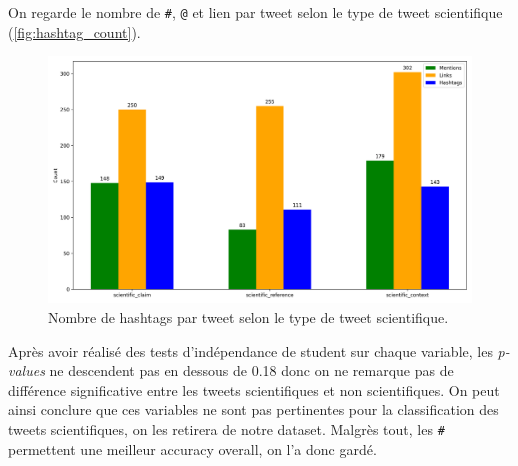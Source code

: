 On regarde le nombre de \texttt{\#}, \texttt{@} et lien par tweet selon le type de tweet scientifique (\autoref{fig:hashtag_count}).

\begin{figure}[H]
    \centering
    \includegraphics[width=1\textwidth]{images/hashtag_links_mentions_count_outliers}
    \caption{Nombre de hashtags par tweet selon le type de tweet scientifique.}
    \label{fig:hashtag_count}
\end{figure}

Après avoir réalisé des tests d'indépendance de student sur chaque variable, les \textit{p-values} ne descendent pas en dessous de 0.18 donc on ne remarque pas de différence significative entre les tweets scientifiques et non scientifiques.
On peut ainsi conclure que ces variables ne sont pas pertinentes pour la classification des tweets scientifiques, on les retirera de notre dataset.
Malgrès tout, les \texttt{\#} permettent une meilleur accuracy overall, on l'a donc gardé.
